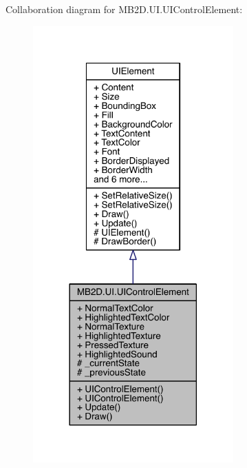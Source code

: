 Collaboration diagram for M\+B2\+D.\+U\+I.\+U\+I\+Control\+Element\+:\nopagebreak
\begin{figure}[H]
\begin{center}
\leavevmode
\includegraphics[width=218pt]{class_m_b2_d_1_1_u_i_1_1_u_i_control_element__coll__graph}
\end{center}
\end{figure}
